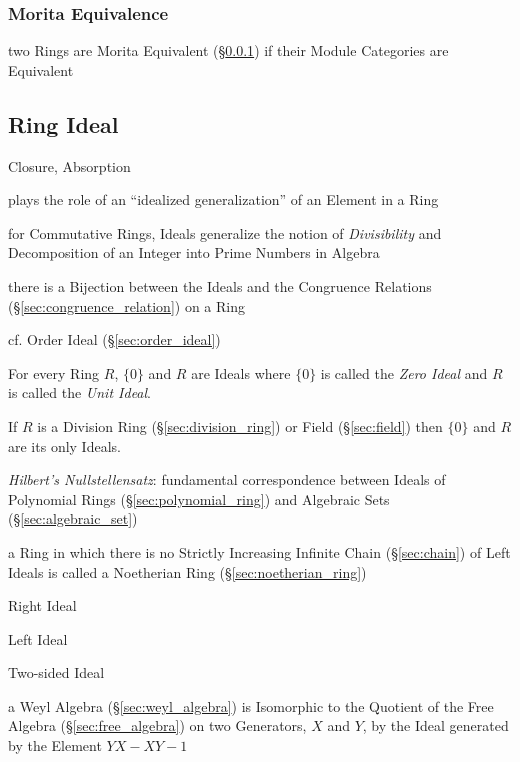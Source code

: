 \subsubsection{Morita Equivalence}\label{sec:morita_equivalence}

two Rings are Morita Equivalent (\S\ref{sec:morita_equivalence}) if their
Module Categories are Equivalent



\subsection{Ring Ideal}\label{sec:ring_ideal}

Closure, Absorption

plays the role of an ``idealized generalization'' of an Element in a Ring

for Commutative Rings, Ideals generalize the notion of \emph{Divisibility} and
Decomposition of an Integer into Prime Numbers in Algebra

there is a Bijection between the Ideals and the Congruence Relations
(\S\ref{sec:congruence_relation}) on a Ring

\fist cf. Order Ideal (\S\ref{sec:order_ideal})

For every Ring $R$, $\{0\}$ and $R$ are Ideals where $\{0\}$ is called
the \emph{Zero Ideal} and $R$ is called the \emph{Unit Ideal}.

If $R$ is a Division Ring (\S\ref{sec:division_ring}) or Field
(\S\ref{sec:field}) then $\{0\}$ and $R$ are its only Ideals.

\emph{Hilbert's Nullstellensatz}: fundamental correspondence between Ideals of
Polynomial Rings (\S\ref{sec:polynomial_ring}) and Algebraic Sets
(\S\ref{sec:algebraic_set})

a Ring in which there is no Strictly Increasing Infinite Chain
(\S\ref{sec:chain}) of Left Ideals is called a Noetherian Ring
(\S\ref{sec:noetherian_ring})

Right Ideal

Left Ideal

Two-sided Ideal

\fist a Weyl Algebra (\S\ref{sec:weyl_algebra}) is Isomorphic to the Quotient
of the Free Algebra (\S\ref{sec:free_algebra}) on two Generators, $X$ and $Y$,
by the Ideal generated by the Element $YX - XY - 1$



